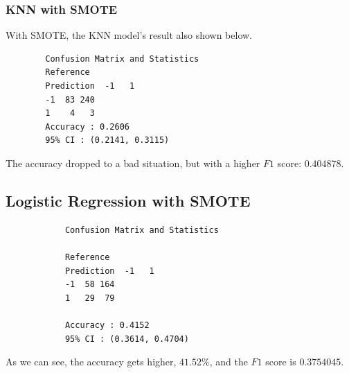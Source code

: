 \documentclass{article}
\begin{document}
	\subsubsection{KNN with SMOTE}
	\par With SMOTE, the KNN model's result also shown below.
			\begin{framed}
		\begin{verbatim}
		Confusion Matrix and Statistics
		Reference
		Prediction  -1   1
		-1  83 240
		1    4   3
		Accuracy : 0.2606          
		95% CI : (0.2141, 0.3115)                      
		\end{verbatim}
	\end{framed}
	The accuracy dropped to a bad situation, but with a higher $F1$ score: 0.404878.
	\subsection{Logistic Regression with SMOTE}
			\begin{framed}
		\begin{verbatim}
			Confusion Matrix and Statistics
			
			Reference
			Prediction  -1   1
			-1  58 164
			1   29  79
			
			Accuracy : 0.4152          
			95% CI : (0.3614, 0.4704)  
		\end{verbatim}
	\end{framed}
	\par As we can see, the accuracy gets higher, $41.52\%$, and the $F1$ score is $0.3754045$.
	\clearpage
\end{document}
